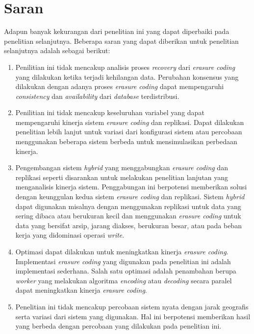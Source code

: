 \section{Saran}
\label{sec:saran}

Adapun banyak kekurangan dari penelitian ini yang dapat diperbaiki pada penelitian selanjutnya. Beberapa saran yang dapat diberikan untuk penelitian selanjutnya adalah sebagai berikut:

\begin{enumerate}
	\item Penilitian ini tidak mencakup analisis proses \textit{recovery} dari \textit{erasure coding} yang dilakukan ketika terjadi kehilangan data. Perubahan konsensus yang dilakukan dengan adanya proses \textit{erasure coding} dapat mempengaruhi \textit{consistency} dan \textit{availability} dari \textit{database} terdistribusi.
	\item Penilitian ini tidak mencakup keseluruhan variabel yang dapat mempengaruhi kinerja sistem \textit{erasure coding} dan replikasi. Dapat dilakukan penelitian lebih lanjut untuk variasi dari konfigurasi sistem atau percobaan menggunakan beberapa sistem berbeda untuk mensimulasikan perbedaan kinerja.
	\item Pengembangan sistem \textit{hybrid} yang menggabungkan \textit{erasure coding} dan replikasi seperti disarankan untuk melakukan penelitian lanjutan yang menganalisis kinerja sistem. Penggabungan ini berpotensi memberikan solusi dengan keunggulan kedua sistem \textit{erasure coding} dan replikasi. Sistem \textit{hybrid} dapat digunakan misalnya dengan menggunakan replikasi untuk data yang sering dibaca atau berukuran kecil dan menggunakan \textit{erasure coding} untuk data yang bersifat arsip, jarang diakses, berukuran besar, atau pada beban kerja yang didominasi operasi \textit{write}.
	\item Optimasi dapat dilakukan untuk meningkatkan kinerja \textit{erasure coding}. Implementasi \textit{erasure coding} yang digunakan pada penelitian ini adalah implementasi sederhana. Salah satu optimasi adalah penambahan berupa \textit{worker} yang melakukan algoritma \textit{encoding} atau \textit{decoding} secara paralel dapat meningkatkan kinerja \textit{erasure coding}.
	\item Penelitian ini tidak mencakup percobaan sistem nyata dengan jarak geografis serta variasi dari sistem yang digunakan. Hal ini berpotensi memberikan hasil yang berbeda dengan percobaan yang dilakukan pada penelitian ini.
\end{enumerate}